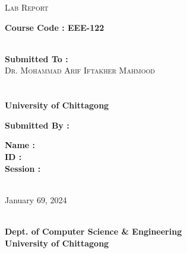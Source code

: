 \documentclass{article}
\begin{document}
\centering
\doublespacing
\begin{spacing}{1}
\textsc{\LARGE Lab Report}\\ 
\vspace{0.3cm}
\hline
\vspace{1.5cm}
\end{spacing}

\raggedright
\begingroup
\centering \textbf{\Large{Course Code : \textbf{EEE-122}}} \\
 \\
\vspace{1.5cm}
\endgroup


\begin{sub}
\centering
\textbf{\large Submitted To :} \\
\textsc{\LARGE Dr. Mohammad Arif Iftakher Mahmood}\\ 
 \\
 \\
\textbf{\Large{University of Chittagong}} \\ \vspace{1cm}
\end{sub}


\begingroup
\centering
\textbf{\large Submitted By :} \\
\endgroup

\begin{name}
\doublespacing
\textbf{\large{Name : }} \\ \vspace{0.5cm}
\textbf{\large{ID : }} \\ \vspace{0.5cm}
\textbf{\large{Session : }} \\ \vspace{1cm}
\end{name}
\centering
{} \\
\vspace{0.3cm}
{\Large January 69, 2024}\\ 
\vspace{0.3cm}
\hline
\vspace{0.5cm}


\begingroup
\centering
{} \\
\textbf{\Large{Dept. of Computer Science \& Engineering}} \\
\textbf{\LARGE{University of Chittagong}} \\
\endgroup
\end{document}

